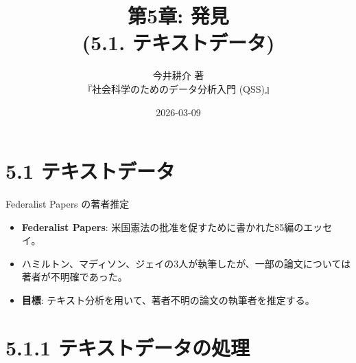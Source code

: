 \documentclass[
  ignorenonframetext,
]{beamer}
\title{第5章: 発見\\
(5.1. テキストデータ)}
\subtitle{今井耕介 著\\
『社会科学のためのデータ分析入門 (QSS)』}
\author{}
\date{\vspace{-2.5em}2026-03-09}
\providecommand{\tightlist}{%
  \setlength{\itemsep}{0pt}\setlength{\parskip}{0pt}}
\begin{document}
\frame{\titlepage}

\hypertarget{ux30c6ux30adux30b9ux30c8ux30c7ux30fcux30bf}{%
\section{5.1
テキストデータ}\label{ux30c6ux30adux30b9ux30c8ux30c7ux30fcux30bf}}

\begin{frame}{Federalist Papers の著者推定}
\protect\hypertarget{federalist-papers-ux306eux8457ux8005ux63a8ux5b9a}{}
\begin{itemize}
\tightlist
\item
  \textbf{Federalist Papers}:
  米国憲法の批准を促すために書かれた85編のエッセイ。
\item
  ハミルトン、マディソン、ジェイの3人が執筆したが、一部の論文については著者が不明確であった。
\item
  \textbf{目標}:
  テキスト分析を用いて、著者不明の論文の執筆者を推定する。
\end{itemize}
\end{frame}

\hypertarget{ux30c6ux30adux30b9ux30c8ux30c7ux30fcux30bfux306eux51e6ux7406}{%
\section{5.1.1
テキストデータの処理}\label{ux30c6ux30adux30b9ux30c8ux30c7ux30fcux30bfux306eux51e6ux7406}}
\end{document}
